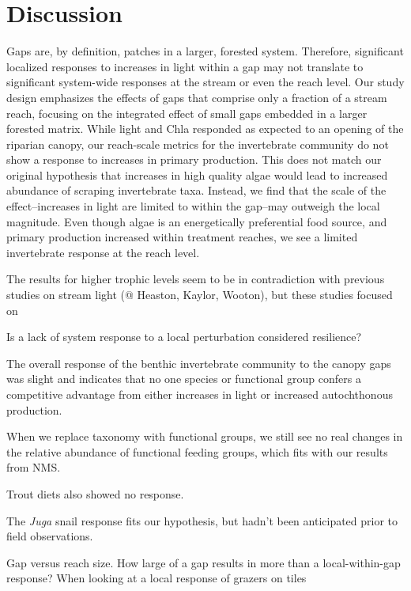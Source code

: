 \documentclass[double,12pt]{beavtex}
\begin{document}
  \chapter*{Discussion}\label{discussion}
  
  Gaps are, by definition, patches in a larger, forested system.
  Therefore, significant localized responses to increases in light within
  a gap may not translate to significant system-wide responses at the
  stream or even the reach level. Our study design emphasizes the effects
  of gaps that comprise only a fraction of a stream reach, focusing on the
  integrated effect of small gaps embedded in a larger forested matrix.
  While light and Chla responded as expected to an opening of the riparian
  canopy, our reach-scale metrics for the invertebrate community do not
  show a response to increases in primary production. This does not match
  our original hypothesis that increases in high quality algae would lead
  to increased abundance of scraping invertebrate taxa. Instead, we find
  that the scale of the effect--increases in light are limited to within
  the gap--may outweigh the local magnitude. Even though algae is an
  energetically preferential food source, and primary production increased
  within treatment reaches, we see a limited invertebrate response at the
  reach level.
  
  The results for higher trophic levels seem to be in contradiction with
  previous studies on stream light (@ Heaston, Kaylor, Wooton), but these
  studies focused on
  
  Is a lack of system response to a local perturbation considered
  resilience?
  
  The overall response of the benthic invertebrate community to the canopy
  gaps was slight and indicates that no one species or functional group
  confers a competitive advantage from either increases in light or
  increased autochthonous production.
  
  When we replace taxonomy with functional groups, we still see no real
  changes in the relative abundance of functional feeding groups, which
  fits with our results from NMS.
  
  Trout diets also showed no response.
  
  The \emph{Juga} snail response fits our hypothesis, but hadn't been
  anticipated prior to field observations.
  
  Gap versus reach size. How large of a gap results in more than a
  local-within-gap response? When looking at a local response of grazers
  on tiles
  
\end{document}
